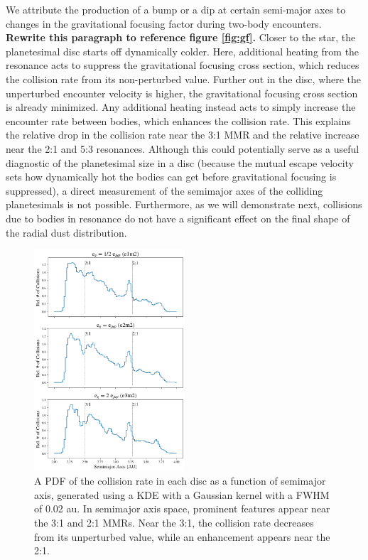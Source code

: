 \documentclass[fleqn,usenatbib]{mnras}
\begin{document}
We attribute the production of a bump or a dip at certain semi-major axes to changes in the gravitational focusing factor during two-body encounters.
\textbf{Rewrite this paragraph to reference figure \ref{fig:gf}.}
Closer to the star, the planetesimal disc starts off dynamically colder. Here, additional heating from the resonance acts to suppress the gravitational 
focusing cross section, which reduces the collision rate from its
non-perturbed value. Further out in the disc, where the unperturbed
encounter velocity is higher, the gravitational focusing cross section
is already minimized. Any additional heating instead acts to simply
increase the encounter rate between bodies, which enhances the
collision rate. This explains the relative drop in the collision rate
near the 3:1 MMR and the relative increase near the 2:1 and 5:3
resonances. Although this could potentially serve as a useful
diagnostic of the planetesimal size in a disc (because the mutual
escape velocity sets how dynamically hot the bodies can get before
gravitational focusing is suppressed), a direct measurement of the
semimajor axes of the colliding planetesimals is not
possible. Furthermore, as we will demonstrate next, collisions due to bodies in resonance do not have a significant effect on the final shape of the radial dust distribution.

\begin{figure}
\begin{center}
    \includegraphics[width=0.5\textwidth]{figures/coll_hist_a.png}
    \caption{A PDF of the collision rate in each disc as a function of semimajor axis, generated using a KDE with a Gaussian kernel with a FWHM of 0.02 au. In semimajor axis space, prominent features appear near the 3:1 and 2:1 MMRs. Near the 3:1, the collision rate decreases from its unperturbed value, while an enhancement appears near the 2:1.\label{fig:coll_hist_a}}
\end{center}
\end{figure}
\end{document}
